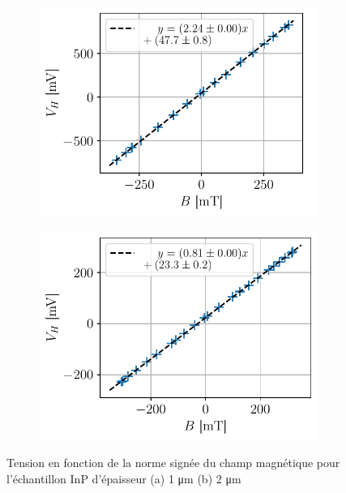 \begin{figure}[h]
    \centering
    \begin{subfigure}{0.45\textwidth}
        \centering
        \includegraphics[width=\textwidth]{figures/U(B),InP1micro.pdf}
        \caption{}
    \end{subfigure}
    \begin{subfigure}{0.45\textwidth}
        \centering
        \includegraphics[width=\textwidth]{figures/U(B),InP2micro.pdf}
        \caption{}
    \end{subfigure}
    \caption{Tension en fonction de la norme signée du champ magnétique pour l'échantillon InP d'épaisseur (a) 1 \si{\micro\meter} (b) 2 \si{\micro\meter}}
    \label{fig:inpV(B)}
\end{figure}


